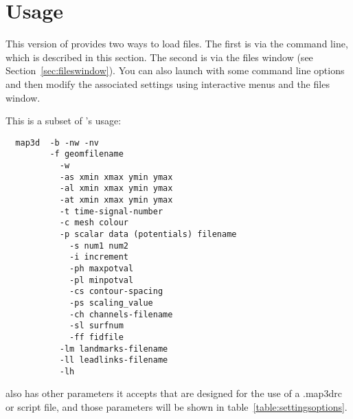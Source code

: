 \section{Usage} 
\label{sec:usage}

This version of \map{} provides two ways to load files.  The first is 
via the command line, which is described in this section.  The second is
via the files window (see Section~\ref{sec:fileswindow}).  You can also
launch \map{} with some command line options and then modify the associated
settings using interactive menus and the files window.  

This is a subset of \map{}'s usage:
\begin{verbatim} 
  map3d  -b -nw -nv
         -f geomfilename 
           -w
           -as xmin xmax ymin ymax 
           -al xmin xmax ymin ymax
           -at xmin xmax ymin ymax 
           -t time-signal-number 
           -c mesh colour
           -p scalar data (potentials) filename 
             -s num1 num2 
             -i increment 
             -ph maxpotval 
             -pl minpotval 
             -cs contour-spacing 
             -ps scaling_value 
             -ch channels-filename 
             -sl surfnum
             -ff fidfile
           -lm landmarks-filename
           -ll leadlinks-filename
           -lh 
\end{verbatim}

\map{} also has other parameters it accepts that are designed for the use
of a .map3drc or script file, and those parameters will be shown in
table~\ref{table:settingsoptions}.

